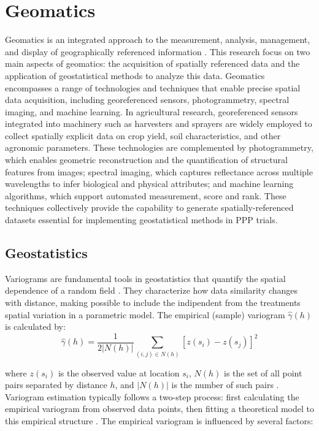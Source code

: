 \documentclass[12pt,a4paper,oneside]{report}
\begin{document}
\section{Geomatics}

Geomatics is an integrated approach to the measurement, analysis, management, 
and display of geographically referenced information 
\cite{gomarascaBasicsGeomatics2009}.  
This research focus on two main aspects of geomatics: the acquisition of spatially 
referenced data and the application of geostatistical methods to analyze 
this data. Geomatics encompasses a range of technologies and techniques that 
enable precise spatial data acquisition, including georeferenced sensors, 
photogrammetry, spectral imaging, and machine learning. 
In agricultural research, georeferenced sensors integrated into machinery such 
as harvesters and sprayers are widely employed to collect spatially explicit 
data on crop yield, soil characteristics, and other agronomic parameters. 
These technologies are complemented by photogrammetry, which enables geometric 
reconstruction and the quantification of structural features from images; 
spectral imaging, which captures reflectance across multiple wavelengths to 
infer biological and physical attributes; and machine learning algorithms, 
which support automated measurement, score and rank. 
These techniques collectively provide the capability to generate 
spatially-referenced datasets essential for implementing geostatistical methods 
in PPP trials.

\subsection{Geostatistics}

Variograms are fundamental tools in geostatistics that quantify 
the spatial dependence of a random field 
\cite{cressieStatisticsSpatialData2015,goovaertsGeostatisticsNaturalResources1997}. 
They characterize how data similarity 
changes with distance, making possible to include the indipendent from the treatments
spatial variation in a parametric model. 
The empirical (sample) variogram $\hat{\gamma}(h)$ is calculated by:
\[
\hat{\gamma}(h) = \frac{1}{2|N(h)|} \sum_{(i,j) \in N(h)} [z(s_i) - z(s_j)]^2
\]

where $z(s_i)$ is the observed value at location $s_i$, $N(h)$ is the set of all 
point pairs separated by distance $h$, and $|N(h)|$ is the number of such pairs
\cite{matheronPrinciplesGeostatistics1963,journelMiningGeostatistics2003}.
Variogram estimation typically follows a two-step process: first calculating the 
empirical variogram from observed data points, then fitting a theoretical model to 
this empirical structure \cite{websterGeostatisticsEnvironmentalScientists2007, oliverGeostatisticalApplicationsPrecision2010}. 
The empirical variogram is influenced by several factors:
\end{document}

